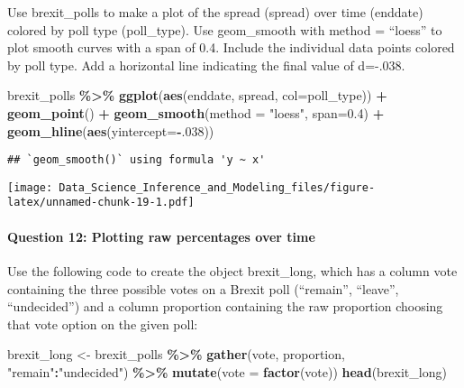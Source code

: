 \documentclass[
]{article}
\newenvironment{Shaded}{\begin{snugshade}}{\end{snugshade}}
\newcommand{\DataTypeTok}[1]{\textcolor[rgb]{0.13,0.29,0.53}{#1}}
\newcommand{\DecValTok}[1]{\textcolor[rgb]{0.00,0.00,0.81}{#1}}
\newcommand{\FloatTok}[1]{\textcolor[rgb]{0.00,0.00,0.81}{#1}}
\newcommand{\KeywordTok}[1]{\textcolor[rgb]{0.13,0.29,0.53}{\textbf{#1}}}
\newcommand{\NormalTok}[1]{#1}
\newcommand{\OperatorTok}[1]{\textcolor[rgb]{0.81,0.36,0.00}{\textbf{#1}}}
\newcommand{\StringTok}[1]{\textcolor[rgb]{0.31,0.60,0.02}{#1}}
\begin{document}
Use brexit\_polls to make a plot of the spread (spread) over time
(enddate) colored by poll type (poll\_type). Use geom\_smooth with
method = ``loess'' to plot smooth curves with a span of 0.4. Include the
individual data points colored by poll type. Add a horizontal line
indicating the final value of d=-.038.

\begin{Shaded}
\begin{Highlighting}[]
\NormalTok{brexit\_polls }\OperatorTok{\%\textgreater{}\%}
\StringTok{  }\KeywordTok{ggplot}\NormalTok{(}\KeywordTok{aes}\NormalTok{(enddate, spread, }\DataTypeTok{col=}\NormalTok{poll\_type)) }\OperatorTok{+}
\StringTok{  }\KeywordTok{geom\_point}\NormalTok{() }\OperatorTok{+}
\StringTok{  }\KeywordTok{geom\_smooth}\NormalTok{(}\DataTypeTok{method =} \StringTok{"loess"}\NormalTok{, }\DataTypeTok{span=}\FloatTok{0.4}\NormalTok{) }\OperatorTok{+}
\StringTok{  }\KeywordTok{geom\_hline}\NormalTok{(}\KeywordTok{aes}\NormalTok{(}\DataTypeTok{yintercept=}\OperatorTok{{-}}\NormalTok{.}\DecValTok{038}\NormalTok{))}
\end{Highlighting}
\end{Shaded}

\begin{verbatim}
## `geom_smooth()` using formula 'y ~ x'
\end{verbatim}

\texttt{[image: Data\_Science\_Inference\_and\_Modeling\_files/figure-latex/unnamed-chunk-19-1.pdf]}

\hypertarget{question-12-plotting-raw-percentages-over-time}{%
\paragraph{Question 12: Plotting raw percentages over
time}\label{question-12-plotting-raw-percentages-over-time}}

Use the following code to create the object brexit\_long, which has a
column vote containing the three possible votes on a Brexit poll
(``remain'', ``leave'', ``undecided'') and a column proportion
containing the raw proportion choosing that vote option on the given
poll:

\begin{Shaded}
\begin{Highlighting}[]
\NormalTok{brexit\_long \textless{}{-}}\StringTok{ }\NormalTok{brexit\_polls }\OperatorTok{\%\textgreater{}\%}
\StringTok{    }\KeywordTok{gather}\NormalTok{(vote, proportion, }\StringTok{"remain"}\OperatorTok{:}\StringTok{"undecided"}\NormalTok{) }\OperatorTok{\%\textgreater{}\%}
\StringTok{    }\KeywordTok{mutate}\NormalTok{(}\DataTypeTok{vote =} \KeywordTok{factor}\NormalTok{(vote))}
\KeywordTok{head}\NormalTok{(brexit\_long)}
\end{Highlighting}
\end{Shaded}
\end{document}
